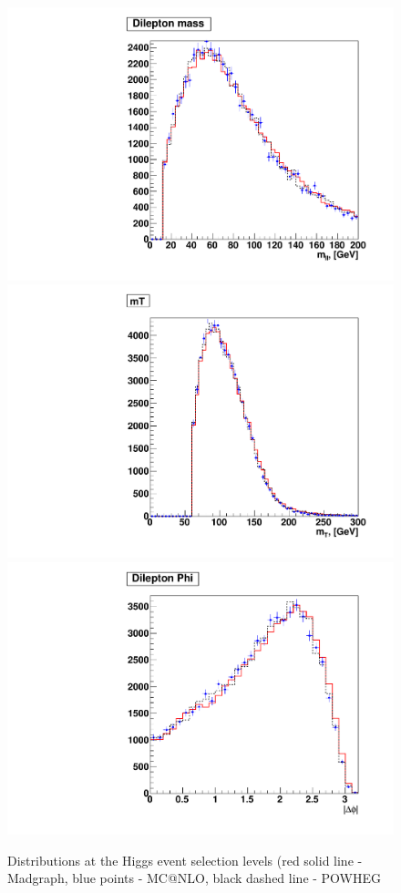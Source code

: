 \begin{figure}[!hbtp]
\centering
\includegraphics[width=.45\textwidth]{figures/wwshape_ref_mll_hww}
\includegraphics[width=.45\textwidth]{figures/wwshape_ref_mt_hww}
\includegraphics[width=.45\textwidth]{figures/wwshape_ref_dphi_hww}
\caption{Distributions at the Higgs event selection levels (red solid line - Madgraph, blue points - MC@NLO, black dashed line - POWHEG}
\label{fig:appendix_wwshape_ref_hww}
\end{figure}
